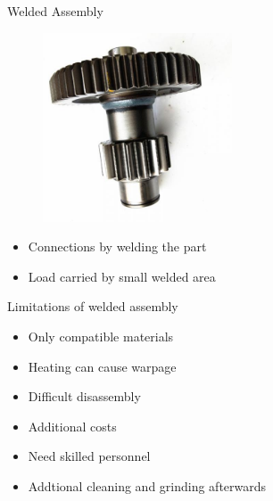 \documentclass[10pt, svgnames]{beamer}
\begin{document}
\begin{frame}[label={sec:org83fee6e}]{Welded Assembly}
\begin{figure}[htbp]
  \centering
  \includegraphics[width=0.5\textwidth]{Pictures/welded-shaft}
\end{figure}

\begin{itemize}
\item Connections by welding the part
\item Load carried by small welded area
\end{itemize}
\end{frame}

\begin{frame}[label={sec:orge573f5c}]{Limitations of welded assembly}
\begin{itemize}
\item Only compatible materials
\item Heating can cause warpage
\item Difficult disassembly
\item Additional costs
\item Need skilled personnel
\item Addtional cleaning and grinding afterwards
\end{itemize}
\end{frame}
\end{document}

